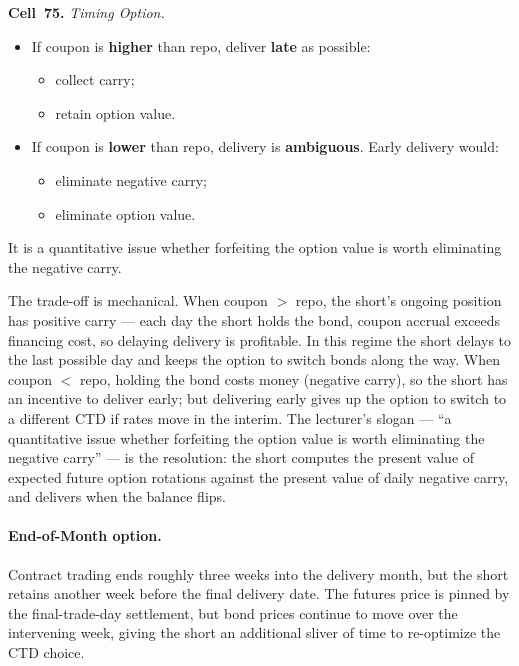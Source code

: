 \begin{keyblock}
\textbf{Cell~75.} \emph{Timing Option.}\\
\begin{itemize}
  \item If coupon is \textbf{higher} than repo, deliver \textbf{late} as
        possible:
        \begin{itemize}
          \item collect carry;
          \item retain option value.
        \end{itemize}
  \item If coupon is \textbf{lower} than repo, delivery is \textbf{ambiguous}.
        Early delivery would:
        \begin{itemize}
          \item eliminate negative carry;
          \item eliminate option value.
        \end{itemize}
\end{itemize}
It is a quantitative issue whether forfeiting the option value is worth
eliminating the negative carry.
\end{keyblock}

The trade-off is mechanical. When coupon $>$ repo, the short's ongoing
position has positive carry --- each day the short holds the bond, coupon
accrual exceeds financing cost, so delaying delivery is profitable. In
this regime the short delays to the last possible day and keeps the
option to switch bonds along the way. When coupon $<$ repo, holding the
bond costs money (negative carry), so the short has an incentive to
deliver early; but delivering early gives up the option to switch to a
different CTD if rates move in the interim. The lecturer's slogan --- ``a
quantitative issue whether forfeiting the option value is worth
eliminating the negative carry'' --- is the resolution: the short computes
the present value of expected future option rotations against the present
value of daily negative carry, and delivers when the balance flips.

\paragraph{End-of-Month option.} Contract trading ends roughly three weeks
into the delivery month, but the short retains another week before the
final delivery date. The futures price is pinned by the final-trade-day
settlement, but bond prices continue to move over the intervening week,
giving the short an additional sliver of time to re-optimize the CTD
choice.

